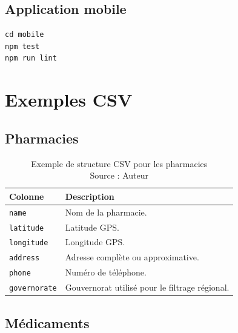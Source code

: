 \subsection*{Application mobile}

\begin{lstlisting}
cd mobile
npm test
npm run lint
\end{lstlisting}

\section{Exemples CSV}

\subsection*{Pharmacies}

\begin{table}[H]
    \centering
    \caption{Exemple de structure CSV pour les pharmacies\\ \small Source : Auteur}
    \begin{tabular}{L{4cm}L{9cm}}
        \toprule
        \textbf{Colonne} & \textbf{Description} \\
        \midrule
        \texttt{name} & Nom de la pharmacie. \\
        \texttt{latitude} & Latitude GPS. \\
        \texttt{longitude} & Longitude GPS. \\
        \texttt{address} & Adresse complète ou approximative. \\
        \texttt{phone} & Numéro de téléphone. \\
        \texttt{governorate} & Gouvernorat utilisé pour le filtrage régional. \\
        \bottomrule
    \end{tabular}
\end{table}

\subsection*{Médicaments}


